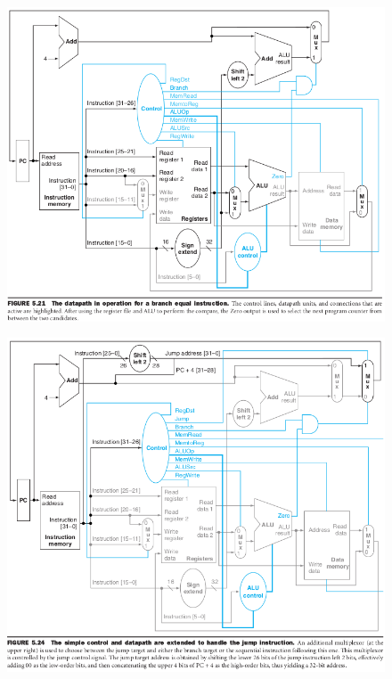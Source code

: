 \documentclass{article}
\begin{document}
\newpage
\begin{figure}[h!]
    \includegraphics[width=\linewidth]{imagenes/pipeline/inst-branch.png}
\end{figure}
\newpage
\begin{figure}[h!]
    \includegraphics[width=\linewidth]{imagenes/pipeline/inst-jump.png}
\end{figure}

\newpage
\end{document}
